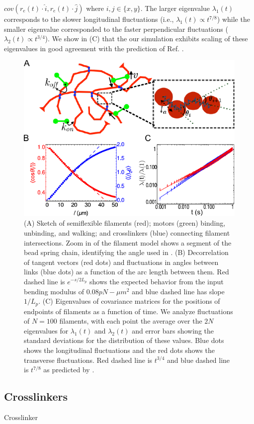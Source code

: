 \documentclass[12pt]{article} \usepackage{times} \usepackage{graphicx}
\begin{document}
$cov(r_e(t)\cdot \hat{i},r_e(t)\cdot \hat{j})$ where $i,j\in\{x,y\}$.  The
larger eigenvalue $\lambda_1(t)$ corresponds to the slower longitudinal
fluctuations (i.e., $\lambda_1(t)\propto t^{7/8}$) while the smaller eigenvalue
corresponded to the faster perpendicular fluctuations ($\lambda_2(t)\propto
t^{3/4}$). We show  in (C) that the our simulation exhibits
scaling of these eigenvalues in good agreement with the prediction of Ref.
\cite{everaers1999}.  \begin{figure}[H] \centering
  \includegraphics[scale=1]{figs/filament/pl_fig.pdf}
  \caption{\label{fig:filament} (A) Sketch of semiflexible filaments (red);
  motors (green) binding, unbinding, and walking; and crosslinkers (blue)
  connecting filament intersections. Zoom in of the filament model shows a
  segment of the bead spring chain, identifying the angle used in
  .  (B) Decorrelation of tangent vectors (red dots) and
  fluctuations in angles between links (blue dots) as a function of the arc
  length between them. Red dashed line is $e^{-s/2L_p}$ shows the expected
  behavior from the input bending modulus of $0.08 pN-\mu m^2$ and blue dashed
  line has slope $1/L_p$.  (C) Eigenvalues of covariance matrices for the
  positions of endpoints of filaments as a function of time. We analyze
  fluctuations of $N=100$ filaments, with each point the average over the $2N$
  eigenvalues for $\lambda_1(t)$ and $\lambda_2(t)$ and error bars showing the
  standard deviations for the distribution of these values. Blue dots shows the
  longitudinal fluctuations and the red dots shows the transverse fluctuations.
  Red dashed line is $t^{3/4}$ and blue dashed line is $t^{7/8}$ as predicted
  by \cite{everaers1999}.  } \end{figure} \subsection{Crosslinkers} Crosslinker
\end{document}
